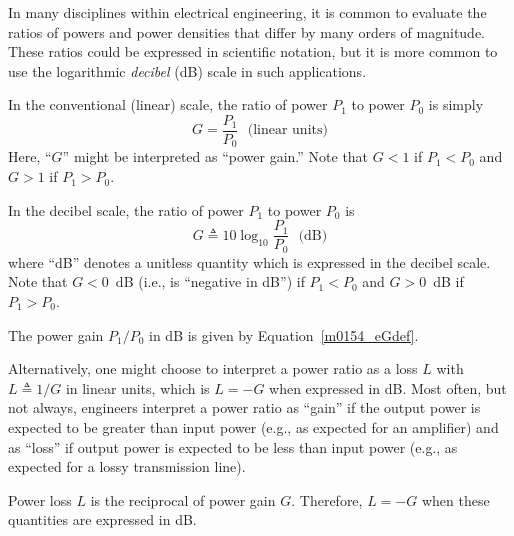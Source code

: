 

\label{m0154_Decibel_Scale_for_Power_Ratio} %

In many disciplines within electrical engineering, it is common to evaluate the ratios of powers and power densities that differ by many orders of magnitude.
These ratios could be expressed in scientific notation, but it is more common to use the logarithmic \emph{decibel} (dB) scale in such applications.

In the conventional (linear) scale, the ratio of power $P_1$ to power $P_0$ is simply
%
\begin{equation} 
G = \frac{P_1}{P_0} ~~~\mbox{(linear units)} 
\end{equation}
%
Here, ``$G$'' might be interpreted as ``power gain.''
Note that $G<1$ if $P_1<P_0$ and $G>1$ if $P_1>P_0$.

In the decibel scale, the ratio of power $P_1$ to power $P_0$ is
%
\begin{equation}
\boxed{
G \triangleq 10\log_{10}\frac{P_1}{P_0} ~~~\mbox{(dB)}
}
\label{m0154_eGdef}
\end{equation} 
%
where ``dB'' denotes a unitless quantity which is expressed in the decibel scale.
Note that $G<0$~dB (i.e., is ``negative in dB'') if $P_1<P_0$ and $G>0$~dB if $P_1>P_0$.
%
\begin{mdframed}[backgroundcolor=yellow!20,nobreak=true] 
The power gain $P_1/P_0$ in dB is given by Equation~\ref{m0154_eGdef}.
\end{mdframed}

Alternatively, one might choose to interpret a power ratio as a loss $L$ with $L\triangleq 1/G$ in linear units, which is $L=-G$ when expressed in dB.
Most often, but not always, engineers interpret a power ratio as ``gain'' if the output power is expected to be greater than input power (e.g., as expected for an amplifier) and 
as ``loss'' 
if output power is expected to be less than input power (e.g., as expected for a lossy transmission line). 
%
\begin{mdframed}[backgroundcolor=yellow!20,nobreak=true] 
Power loss $L$ is the reciprocal of power gain $G$.  Therefore, $L=-G$ when these quantities are expressed in dB.
\end{mdframed}

